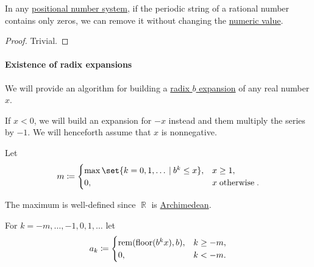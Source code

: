 \begin{proposition}\label{thm:removing_periodic_digit_string}
  In any \hyperref[def:positional_number_system]{positional number system}, if the periodic string of a rational number contains only zeros, we can remove it without changing the \hyperref[def:positional_notation_as_radix_expansion/rational_numbers]{numeric value}.
\end{proposition}
\begin{proof}
  Trivial.
\end{proof}

\paragraph{Existence of radix expansions}

\begin{algorithm}\label{alg:real_number_radix_expansion}
  We will provide an algorithm for building a \hyperref[def:real_number_radix_expansion]{radix \( b \) expansion} of any real number \( x \).

  \begin{thmenum}
     If \( x < 0 \), we will build an expansion for \( -x \) instead and them multiply the series by \( -1 \). We will henceforth assume that \( x \) is nonnegative.

     Let
    \begin{equation}\label{eq:alg:real_number_radix_expansion/m}
      m \coloneqq \begin{cases}
        \max\set{ k = 0, 1, \ldots \given b^k \leq x }, &x \geq 1, \\
        0,                                              &x \T{otherwise}.
      \end{cases}
    \end{equation}

    The maximum is well-defined since \( \BbbR \) is \hyperref[def:archimedean_field]{Archimedean}.

     For \( k = -m, \ldots, -1, 0, 1, \ldots \) let
    \begin{equation}\label{eq:alg:real_number_radix_expansion/direct}
      a_k \coloneqq \begin{cases}
        \operatorname{rem}(\operatorname{floor}(b^k x), b), &k \geq -m, \\
        0,                      &k < -m.
      \end{cases}
    \end{equation}


\end{thmenum}
\end{algorithm}
